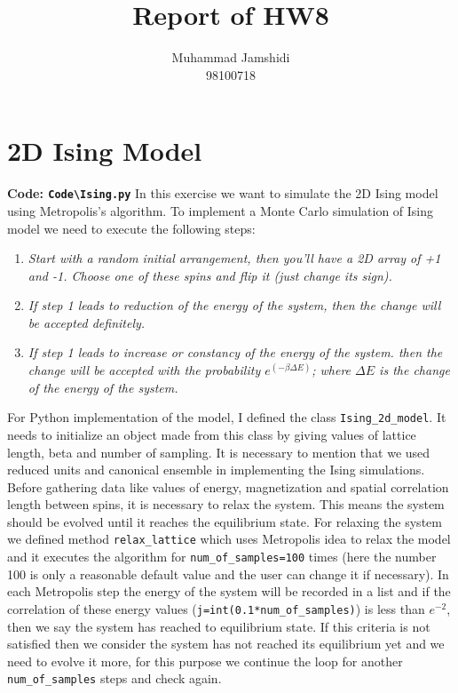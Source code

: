 \documentclass[12pt, a4paper]{article}
\title{Report of HW8}
\author{Muhammad Jamshidi \\ 98100718}
\date{}
\begin{document}
	\maketitle
	\section{2D Ising Model}
	\textbf{Code: \texttt{Code\textbackslash Ising.py}}
	\newline
In this exercise we want to simulate the 2D Ising model using Metropolis's algorithm. To implement a Monte Carlo simulation of Ising model we need to execute the following steps:
\begin{enumerate}
	\item 
	\textit{	Start with a random initial arrangement, then you'll have a 2D array of +1 and -1. Choose one of these spins and flip it (just change its sign).}
	\item 
	\textit{If step 1 leads to reduction of the energy of the system, then the change will be accepted definitely.}
	\item 
	\textit{If step 1 leads to increase or constancy of the energy of the system. then the change will be accepted with the probability $e^{(-\beta \Delta E)}$; where $\Delta E$ is the change of the energy of the system.}
\end{enumerate}
For Python implementation of the model, I defined the class \verb|Ising_2d_model|. It needs to initialize an object made from this class by giving values of lattice length, beta and number of sampling. It is necessary to mention that we used reduced units and canonical ensemble  in implementing the Ising simulations. 
\newline
Before gathering data like values of energy, magnetization and spatial correlation length between spins, it is necessary to relax the system. This means the system should be evolved until it reaches the equilibrium state. 
For relaxing the system we defined method \verb|relax_lattice| which uses Metropolis idea to relax the model and it executes the algorithm for \verb|num_of_samples=100| times (here the number 100 is only a reasonable default value and the user can change it if necessary). In each Metropolis step the energy of the system will be recorded in a list and if the correlation of these energy values (\verb|j=int(0.1*num_of_samples)|) is less than $e^{-2}$, then we say the system has reached to equilibrium state. If this criteria is not satisfied then we consider the system has not reached its equilibrium yet and we need to evolve it more, for this purpose we continue the loop for another \verb|num_of_samples| steps and check again.
\end{document}
